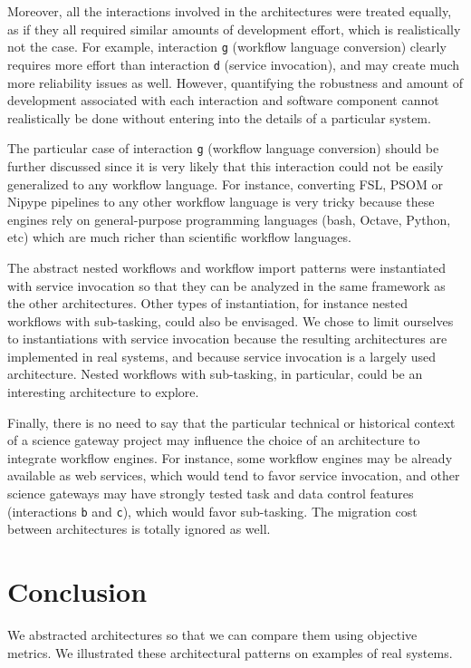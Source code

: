 \documentclass[preprint,3p,twocolumn]{elsarticle}
\begin{document}
Moreover, all the interactions involved in the architectures were
treated equally, as if they all required similar amounts of
development effort, which is realistically not the case. For example,
interaction \texttt{g} (workflow language conversion) clearly requires
more effort than interaction \texttt{d} (service invocation), and may
create much more reliability issues as well. However, quantifying the
robustness and amount of development associated with each interaction
and software component cannot realistically be done without entering
into the details of a particular system.

The particular case of interaction \texttt{g} (workflow language
conversion) should be further discussed since it is very likely that
this interaction could not be easily generalized to any workflow
language. For instance, converting FSL, PSOM or Nipype pipelines to
any other workflow language is very tricky because these engines rely
on general-purpose programming languages (bash, Octave, Python, etc)
which are much richer than scientific workflow languages.

The abstract nested workflows and workflow import patterns were
instantiated with service invocation so that they can be analyzed in
the same framework as the other architectures. Other types of
instantiation, for instance nested workflows with sub-tasking, could
also be envisaged. We chose to limit ourselves to instantiations with
service invocation because the resulting architectures are implemented in 
real systems, and because service invocation is a largely
used architecture. Nested workflows with sub-tasking, in particular,
could be an interesting architecture to explore. 

Finally, there is no need to say that the particular technical or
historical context of a science gateway project may influence the
choice of an architecture to integrate workflow engines. For instance,
some workflow engines may be already available as web services, which
would tend to favor service invocation, and other science gateways may
have strongly tested task and data control features (interactions
\texttt{b} and \texttt{c}), which would favor sub-tasking. The
migration cost between architectures is totally ignored as well.

\section{Conclusion}

We abstracted architectures so that we can compare them using
objective metrics. We illustrated these architectural patterns on
examples of real systems.
\end{document}
